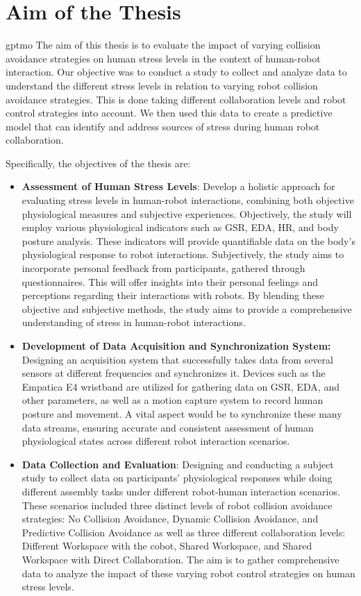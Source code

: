 \section{Aim of the Thesis}\gls*{gptmo}
The aim of this thesis is to evaluate the impact of varying collision avoidance strategies on human stress levels in the context of human-robot interaction. Our objective was to conduct a study to collect and analyze data to understand the different stress levels in relation to varying robot collision avoidance strategies. This is done taking different collaboration levels and robot control strategies into account. We then used this data to create a predictive model that can identify and address sources of stress during human robot collaboration.

Specifically, the objectives of the thesis are: 
\begin{itemize}
	\item \textbf{Assessment of Human Stress Levels}: Develop a holistic approach for evaluating stress levels in human-robot interactions, combining both objective physiological measures and subjective experiences. Objectively, the study will employ various physiological indicators such as \gls{GSR}, \gls{EDA}, \gls{HR}, and body posture analysis. These indicators will provide quantifiable data on the body's physiological response to robot interactions. Subjectively, the study aims to incorporate personal feedback from participants, gathered through questionnaires. This will offer insights into their personal feelings and perceptions regarding their interactions with robots. By blending these objective and subjective methods, the study aims to provide a comprehensive understanding of stress in human-robot interactions.
	\item \textbf{Development of Data Acquisition and Synchronization System:} Designing an acquisition system that successfully takes data from several sensors at different frequencies and synchronizes it. Devices such as the Empatica E4 wristband are utilized for gathering data on \gls{GSR}, \gls{EDA}, and other parameters, as well as a motion capture system to record human posture and movement. A vital aspect would be to synchronize these many data streams, ensuring accurate and consistent assessment of human physiological states across different robot interaction scenarios. 
	\item \textbf{Data Collection and Evaluation}: Designing and conducting a subject study to collect data on participants' physiological responses while doing different assembly tasks under different robot-human interaction scenarios. These scenarios included three distinct levels of robot collision avoidance strategies: No Collision Avoidance, Dynamic Collision Avoidance, and Predictive Collision Avoidance as well as three different collaboration levels: Different Workspace with the cobot, Shared Workspace, and Shared Workspace with Direct Collaboration. The aim is to gather comprehensive data to analyze the impact of these varying robot control strategies on human stress levels. 

\end{itemize}

